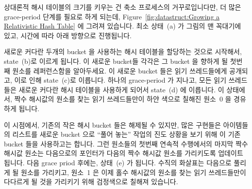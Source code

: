 상대론적 해시 테이블의 크기를 키우는 건 축소 프로세스의 거꾸로입니다만, 더 많은
grace-period 단계를 필요로 하게 되는데,
Figure~\ref{fig:datastruct:Growing a Relativistic Hash Table} 에 그려져
있습니다.
최소 상태~(a) 가 그림의 맨 꼭대기에 있고, 시간에 따라 아래 방향으로 진행됩니다.

새로운 커다란 두개의 bucket 을 사용하는 해시 테이블을 할당하는 것으로 시작해서,
state~(b)로 이르게 됩니다.
이 새로운 bucket들 각각은 그 bucket 을 향하게 될 첫번째 원소를 레퍼런스함을
알아두세요.
이 새로운 bucket 들은 읽기 쓰레드들에게 공개되고, 이로 인해 state~(c)로
이릅니다.
하나의 grace-period 가 지나고, 모든 읽기 쓰레드들은 새로운 커다란 해시 테이블을
사용하게 되어서 state~(d) 에 이릅니다.
이 상태에서, 짝수 해시값의 원소를 찾는 읽기 쓰레드들만이 하얀 색으로 칠해진
원소~0 을 경유하게 됩니다.

이 시점에서, 기존의 작은 해시 bucket 들은 해제될 수 있지만, 많은 구현들은
아이템들의 리스트를 새로운 bucket 으로 ``풀어 놓는'' 작업의 진도 상황을 보기
위해 이 기존 bucket 들을 사용하고는 합니다.
그런 원소들의 첫번째 연속적 수행에서의 마지막 짝수 해시값 원소는 다음으로의
포인터가 다음의 짝수 해시값 원소를 가리키도록 업데이트 됩니다.
다음 grace priod 후에는, 상태~(e) 가 됩니다.
수직의 화살표는 다음으로 풀리게 될 원소를 가리키고, 원소~1 은 이제 홀수
해시값의 원소를 찾는 읽기 쓰레드들만이 다다르게 될 것을 가리키기 위해
검정색으로 칠해져 있습니다.

